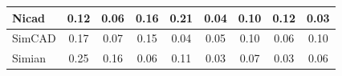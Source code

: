 \documentclass[review]{elsarticle}
\begin{document}
\begin{table}[]
\begin{tabular}{|l|c|c|c|c|c|c|c|c|}
Nicad                                   & 0.12            & 0.06              & 0.16           & 0.21           & 0.04             & 0.10            & 0.12           & 0.03         \\ \hline
SimCAD                                  & 0.17            & 0.07              & 0.15           & 0.04           & 0.05             & 0.10            & 0.06           & 0.10         \\ \hline
Simian                                  & 0.25            & 0.16              & 0.06           & 0.11           & 0.03             & 0.07            & 0.03           & 0.06         \\ \hline
\end{tabular}
\end{table}
\end{document}
